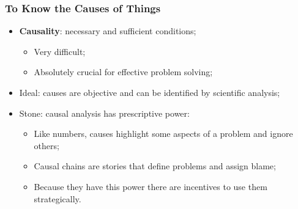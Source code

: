 \documentclass[aspectratio=169]{beamer}
\theoremstyle{principle}
\begin{document}
\begin{frame}
\frametitle{To Know the Causes of Things}
\begin{itemize}
\item \textbf{Causality}: necessary and sufficient conditions;
\begin{itemize}
\item Very difficult;
\item Absolutely crucial for effective problem solving;
\end{itemize}
\bigskip
\bigskip
\item Ideal: causes are objective and can be identified by scientific analysis;
\bigskip
\bigskip
\item Stone: causal analysis has prescriptive power:
\begin{itemize}
\item Like numbers, causes highlight some aspects of a problem and ignore others;
\item Causal chains are stories that define problems and assign blame;
\item Because they have this power there are incentives to use them strategically.
\end{itemize}
\end{itemize}
\end{frame}
\end{document}
